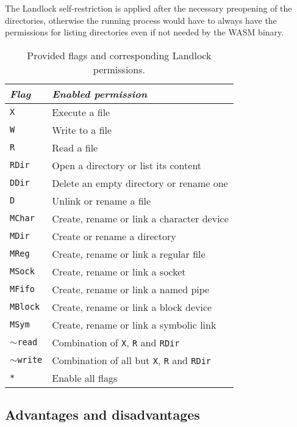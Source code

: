 The Landlock self-restriction is applied after the necessary preopening of the directories,
otherwise the running process would have to always have the permissions for listing directories even if
not needed by the WASM binary.

\begin{table}
  \centering
  \begin{tabular}{|l|l|}
    \hline
    \textit{Flag} & \textit{Enabled permission} \\ \hline\hline
    \texttt{X} & Execute a file \\ \hline
    \texttt{W} & Write to a file \\ \hline
    \texttt{R} & Read a file \\ \hline
    \texttt{RDir} & Open a directory or list its content \\ \hline
    \texttt{DDir} & Delete an empty directory or rename one \\ \hline
    \texttt{D} & Unlink or rename a file \\ \hline
    \texttt{MChar} & Create, rename or link a character device \\ \hline
    \texttt{MDir} & Create or rename a directory \\ \hline
    \texttt{MReg} & Create, rename or link a regular file \\ \hline
    \texttt{MSock} & Create, rename or link a socket \\ \hline
    \texttt{MFifo} & Create, rename or link a named pipe \\ \hline
    \texttt{MBlock} & Create, rename or link a block device \\ \hline
    \texttt{MSym} & Create, rename or link a symbolic link \\ \hline
    \texttt{$\sim$read} & Combination of \texttt{X}, \texttt{R} and \texttt{RDir} \\ \hline
    \texttt{$\sim$write} & Combination of all but \texttt{X}, \texttt{R} and \texttt{RDir} \\ \hline
    \texttt{*} & Enable all flags \\ \hline
  \end{tabular}
  \caption{Provided flags and corresponding Landlock permissions.}
  \label{table:landlock-flags}
\end{table}

\subsection{Advantages and disadvantages}


